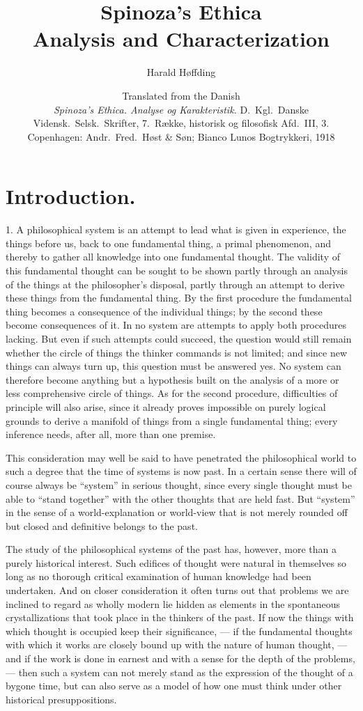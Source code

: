 \documentclass[12pt]{article}
\title{Spinoza's Ethica\\[0.4em]\large Analysis and Characterization}
\author{Harald Høffding}
\date{Translated from the Danish\\[0.6em]
  \small \textit{Spinoza's Ethica. Analyse og Karakteristik.} D.\ Kgl.\ Danske
  Vidensk.\ Selsk.\ Skrifter, 7.\ Række, historisk og filosofisk Afd.\ III, 3.
  Copenhagen: Andr.\ Fred.\ Høst \& Søn; Bianco Lunos Bogtrykkeri, 1918}
\newcommand{\opage}[1]{\marginnote{\footnotesize\textit{[#1]}}}
\begin{document}
\maketitle
\thispagestyle{empty}
\clearpage

\opage{3}\section*{Introduction.}

1. A philosophical system is an attempt to lead what is given in experience,
the things before us, back to one fundamental thing, a primal phenomenon, and
thereby to gather all knowledge into one fundamental thought. The validity of
this fundamental thought can be sought to be shown partly through an analysis
of the things at the philosopher's disposal, partly through an attempt to derive
these things from the fundamental thing. By the first procedure the fundamental
thing becomes a consequence of the individual things; by the second these become
consequences of it. In no system are attempts to apply both procedures lacking.
But even if such attempts could succeed, the question would still remain whether
the circle of things the thinker commands is not limited; and since new things
can always turn up, this question must be answered yes. No system can therefore
become anything but a hypothesis built on the analysis of a more or less
comprehensive circle of things. As for the second procedure, difficulties of
principle will also arise, since it already proves impossible on purely logical
grounds to derive a manifold of things from a single fundamental thing; every
inference needs, after all, more than one premise.

This consideration may well be said to have penetrated the philosophical world
to such a degree that the time of systems is now past. In a certain sense there
will of course always be ``system'' in serious thought, since every single
thought must be able to ``stand together'' with the other thoughts that are
held fast. But ``system'' in the sense of a world-explanation or world-view that
is not merely rounded off but closed and definitive belongs to the past.

The study of the philosophical systems of the past has, however, more than a
purely historical interest. Such edifices of thought were natural in themselves
so long as no thorough critical examination of human knowledge had been
undertaken. And on closer consideration it often turns out that problems we are
inclined to regard as wholly modern lie hidden as elements in the spontaneous
crystallizations that took place in the thinkers of the past. If now the things
with which thought is occupied keep their significance, --- if the fundamental
thoughts with which it works are closely bound up with the nature of human
thought, --- and if the work is done in earnest and with a sense for the depth of
the problems, --- then such a \opage{4}system can not merely stand as the
expression of the thought of a bygone time, but can also serve as a model of how
one must think under other historical presuppositions.
\end{document}
